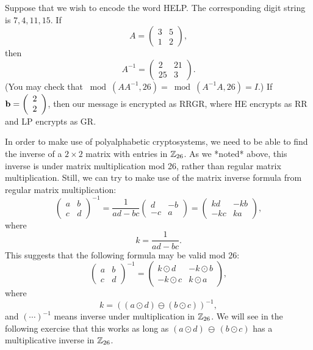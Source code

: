 \begin{example}{4}
Suppose that we wish to encode the word HELP. The corresponding
digit string is $7, 4, 11, 15$. If
$$
A =
\left(
\begin{array}{cc}
3 & 5 \\
1 & 2
\end{array}
\right),
$$
then
$$
A^{-1} 
=
\left(
\begin{array}{cc}
2 & 21 \\
25 & 3
\end{array}
\right).
$$
(You may check that $\bmod(AA^{-1},26) = \bmod(A^{-1}A,26) = I$.)
If ${\bold b} = \left( \begin{array}{c} 2 \\ 2 \end{array} \right)$, then our message is encrypted as
RRGR, where HE encrypts as RR and LP encrypts as GR.
\end{example}
In order to make use of polyalphabetic cryptosystems, we need to be able to find the inverse of a $2 \times 2$ matrix
with entries in ${\Bbb Z}_{26}$. As we *noted* above, this inverse is under matrix multiplication mod 26, rather than regular matrix multiplication.
Still, we can try to make use of the matrix inverse formula from regular matrix multiplication:
$$
\left( \begin{array}{cc} a & b \\ c & d \end{array} \right)^{-1}
= \frac{1}{ad-bc} \left( \begin{array}{cc} d & -b \\ -c & a \end{array} \right)  =  \left( \begin{array}{cc} kd & -kb \\ -kc & ka \end{array} \right),
$$
where 
$$ k = \frac{1}{ad - bc}.$$
This suggests that the following formula may be valid mod 26:
$$
\left( \begin{array}{cc} a & b \\ c & d \end{array} \right)^{-1}
=
\left( \begin{array}{cc} k \odot d & -k \odot b \\ -k \odot c & k \odot a \end{array} \right),
$$
where 
$$ k = ((a \odot d) \ominus (b \odot c))^{-1},$$
and $(\cdots)^{-1}$ means inverse under multiplication in ${\Bbb Z}_{26}$. 
We will see in the following exercise that  this works as long as $(a \odot d) \, \ominus \, (b \odot c)$ has a multiplicative inverse in ${\Bbb Z}_{26}$.

